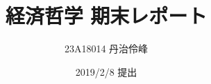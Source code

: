\documentclass[11pt]{jsarticle}
\begin{document}
\title{経済哲学 期末レポート}
\author{23A18014 丹治伶峰}
\date{2019/2/8 提出}
\maketitle
\end{document}
